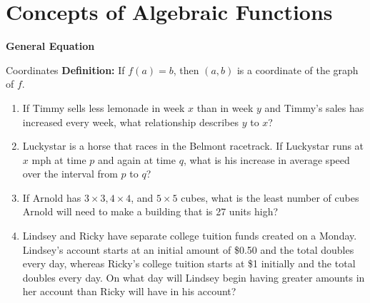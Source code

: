 \section[Algebraic Functions]{Concepts of Algebraic Functions}

\bigskip
\textbf{General Equation}

\bigskip
\begin{equationbox}{Coordinates}
\textbf{Definition:} If $f(a)=b$, then $(a,b)$ is a coordinate of the graph of $f$.
\end{equationbox}

\bigskip
\begin{enumerate}[labelindent=*,style=multiline,leftmargin=*,label=\textbf{Example \arabic*:}]
\item If Timmy sells less lemonade in week $x$ than in week $y$ and Timmy's sales has increased every week, what relationship describes $y$ to $x$?

\vfill\item Luckystar is a horse that races in the Belmont racetrack. If Luckystar runs at $x$ mph at time $p$ and again at time $q$, what is his increase in average speed over the interval from $p$ to $q$?

\vfill\item If Arnold has $3\times3, 4\times4$, and $5\times5$ cubes, what is the least number of cubes Arnold will need to make a building that is 27 units high?

\vfill\item Lindsey and Ricky have separate college tuition funds created on a Monday. Lindsey's account starts at an initial amount of \$0.50 and the total doubles every day, whereas Ricky's college tuition starts at \$1 initially and the total doubles every day. On what day will Lindsey begin having greater amounts in her account than Ricky will have in his account?
\end{enumerate}

